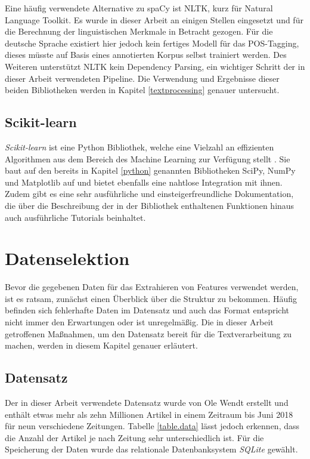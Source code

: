 Eine häufig verwendete Alternative zu spaCy ist NLTK, kurz für Natural Language Toolkit. Es wurde in dieser Arbeit an einigen Stellen eingesetzt und für die Berechnung der linguistischen Merkmale in Betracht gezogen. Für die deutsche Sprache existiert hier jedoch kein fertiges Modell für das POS-Tagging, dieses müsste auf Basis eines annotierten Korpus selbst trainiert werden. Des Weiteren unterstützt NLTK kein Dependency Parsing, ein wichtiger Schritt der in dieser Arbeit verwendeten Pipeline. Die Verwendung und Ergebnisse dieser beiden Bibliotheken werden in Kapitel \ref{textprocessing} genauer untersucht.

\subsection{Scikit-learn}
\emph{Scikit-learn} ist eine Python Bibliothek, welche eine Vielzahl an effizienten Algorithmen aus dem Bereich des Machine Learning zur Verfügung stellt \cite{scikit-learn}. Sie baut auf den bereits in Kapitel \ref{python} genannten Bibliotheken SciPy, NumPy und Matplotlib auf und bietet ebenfalls eine nahtlose Integration mit ihnen. Zudem gibt es eine sehr ausführliche und einsteigerfreundliche Dokumentation, die über die Beschreibung der in der Bibliothek enthaltenen Funktionen hinaus auch ausführliche Tutorials beinhaltet.

\section{Datenselektion}
Bevor die gegebenen Daten für das Extrahieren von Features verwendet werden, ist es ratsam, zunächst einen Überblick über die Struktur zu bekommen. Häufig befinden sich fehlerhafte Daten im Datensatz und auch das Format entspricht nicht immer den Erwartungen oder ist unregelmäßig. Die in dieser Arbeit getroffenen Maßnahmen, um den Datensatz bereit für die Textverarbeitung zu machen, werden in diesem Kapitel genauer erläutert.

\subsection{Datensatz}
Der in dieser Arbeit verwendete Datensatz wurde von Ole Wendt erstellt und enthält etwas mehr als zehn Millionen Artikel in einem Zeitraum bis Juni 2018 für neun verschiedene Zeitungen. Tabelle \ref{table.data} lässt jedoch erkennen, dass die Anzahl der Artikel je nach Zeitung sehr unterschiedlich ist. Für die Speicherung der Daten wurde das relationale Datenbanksystem \emph{SQLite} gewählt.

